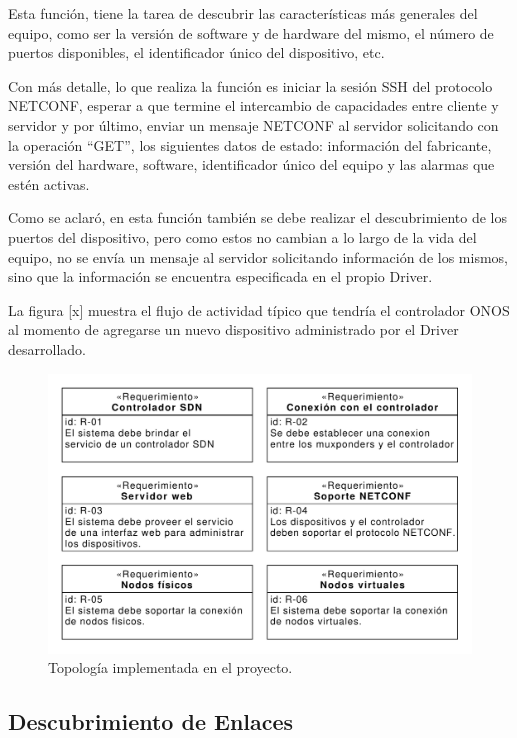    Esta función, tiene la tarea de descubrir las características más generales del equipo, como ser la versión de software y de hardware del mismo, el número de puertos disponibles, el identificador único del dispositivo, etc.

    Con más detalle, lo que realiza la función es iniciar la sesión SSH del protocolo NETCONF, esperar a que termine el intercambio de capacidades entre cliente y servidor y por último, enviar un mensaje NETCONF al servidor solicitando con la operación “GET”, los siguientes datos de estado:  información del fabricante, versión del hardware, software, identificador único del equipo y las alarmas que estén activas. 

    Como se aclaró, en esta función también se debe realizar el descubrimiento de los puertos del dispositivo, pero como estos no cambian a lo largo de la vida del equipo, no se envía un mensaje al servidor solicitando información de los mismos, sino que la información se encuentra especificada en el propio Driver.

    La figura [x] muestra el flujo de actividad típico que tendría el controlador ONOS al momento de agregarse un nuevo dispositivo administrado por el Driver desarrollado.
    
    \begin{figure}[H]
        \centering
        \includegraphics[scale=0.65]{Figures/req_sys.pdf}
        \caption{Topología implementada en el proyecto.}
        \label{fig:req_sys}
      \end{figure}

\subsection{Descubrimiento de Enlaces}

